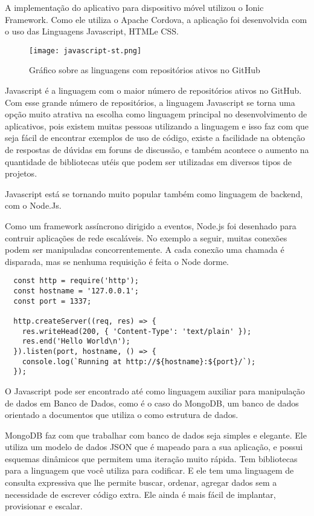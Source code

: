 A implementação do aplicativo para dispositivo móvel utilizou o Ionic Framework. Como ele utiliza o Apache Cordova, a aplicação foi desenvolvida com o uso das Linguagens Javascript, HTMLe CSS.

\begin{figure}[!htb]
	\centering
	\texttt{[image: javascript-st.png]} %
	\caption[Linguagens com maior número de repositórios ativos no GitHub]{Gráfico sobre as linguagens com repositórios ativos no GitHub}
	\label{fig:javascript}
\end{figure}

Javascript é a linguagem com o maior número de repositórios ativos no GitHub. Com esse grande número de repositórios, a linguagem Javascript se torna uma opção muito atrativa na escolha como linguagem principal no desenvolvimento de aplicativos, pois existem muitas pessoas utilizando a linguagem e isso faz com que seja fácil de encontrar exemplos de uso de código, existe a facilidade na obtenção de respostas de dúvidas em foruns de discussão, e também acontece o aumento na quantidade de bibliotecas utéis que podem ser utilizadas em diversos tipos de projetos.

Javascript está se tornando muito popular também como linguagem de backend, com o Node.Js.
\begin{citacao}
Como um framework assíncrono dirigido a eventos, Node.js foi desenhado para contruir aplicações de rede escaláveis. No exemplo a seguir, muitas conexões podem ser manipuladas concorrentemente. A cada conexão uma chamada é disparada, mas se nenhuma requisição é feita o Node dorme. \cite{nodejs}

\begin{verbatim}
  const http = require('http');
  const hostname = '127.0.0.1';
  const port = 1337;

  http.createServer((req, res) => {
    res.writeHead(200, { 'Content-Type': 'text/plain' });
    res.end('Hello World\n');
  }).listen(port, hostname, () => {
    console.log(`Running at http://${hostname}:${port}/`);
  });
\end{verbatim}
\end{citacao}

O Javascript pode ser encontrado até como linguagem auxiliar para manipulação de dados em Banco de Dados, como é o caso do MongoDB, um banco de dados orientado a documentos que utiliza o  como estrutura de dados.
\begin{citacao}
MongoDB faz com que trabalhar com banco de dados seja simples e elegante. Ele utiliza um modelo de dados JSON que é mapeado para a sua aplicação, e possui esquemas dinâmicos que permitem uma iteração muito rápida. Tem bibliotecas para a linguagem que você utiliza para codificar. E ele tem uma linguagem de consulta expressiva que lhe permite buscar, ordenar, agregar dados sem a necessidade de escrever código extra. Ele ainda é mais fácil de implantar, provisionar e escalar.\cite{mongodb}
\end{citacao}